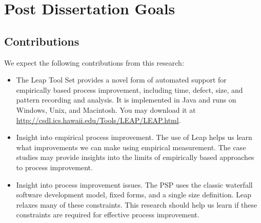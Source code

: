 
\chapter{Post Dissertation Goals}

\section{Contributions}
We expect the following contributions from this research:
\begin{itemize}
  
\item{The Leap Tool Set provides a novel form of automated support for
    empirically based process improvement, including time, defect, size,
    and pattern recording and analysis. It is implemented in Java and runs
    on Windows, Unix, and Macintosh. You may download it at
    \url{http://csdl.ics.hawaii.edu/Tools/LEAP/LEAP.html}.}

\item{Insight into empirical process improvement.  The use of Leap helps us
    learn what improvements we can make using empirical measurement.  The
    case studies may provide insights into the limits of empirically based
    approaches to process improvement.}
  
\item{Insight into process improvement issues.  The PSP uses the classic
    waterfall software development model, fixed forms, and a single size
    definition. Leap relaxes many of these constraints.  This research
    should help us learn if these constraints are required for effective
    process improvement.}


\end{itemize}

